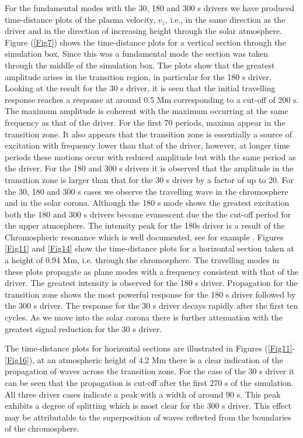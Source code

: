 \documentclass[preprint,authoryear,12pt]{elsarticle}
\begin{document}
For the fundamental modes with the 30, 180 and 300 s drivers we have produced time-distance plots of the plasma velocity, $v_z$, i.e., in the same direction as the driver and in the direction of increasing height through the solar atmosphere.  Figure (\ref{Fig7})
 shows the time-distance plots for a vertical section through the simulation box. Since this was a fundamental mode the section was taken through the middle of the simulation box. The plots show that the greatest amplitude arises in the transition region, in particular for the 180 s driver. Looking at the result for the 30 s driver, it is seen that the initial travelling response reaches a response at around 0.5 Mm corresponding to a cut-off of 200 s. The maximum amplitude is coherent with the maximum occurring at the same frequency as that of the driver. For the first 70 periods, maxima appear in the transition zone. It also appears that the transition zone is essentially a source of excitation with frequency lower than that of the driver, however, at longer time periods these motions occur with reduced amplitude but with the same period as the driver. For the 180 and 300 s drivers it is observed that the amplitude in the transition zone is larger than that for the 30 s driver by a factor of up to 20. For the 30, 180 and 300 s cases we observe the travelling wave in the chromosphere and in the solar corona. Although the 180 s mode shows the greatest excitation both the 180 and 300 s drivers become evanescent due the the cut-off period for the upper atmosphere. The intensity peak for the 180s  driver is a result of the Chromospheric resonance which is well documented, see for example \citet{Fleck1991}.  Figures \ref{Fig11} and \ref{Fig14} show the time-distance plots for a horizontal section taken at a height of 0.94 Mm, i.e. through the chromosphere. The travelling modes in these plots propagate as plane modes with a frequency consistent with that of the driver. The greatest intensity is observed for the 180 s driver. Propagation for the transition zone shows the most powerful response for the 180 s driver followed by the 300 s driver. The response for the 30 s driver decays rapidly after the first ten cycles. As we move into the solar corona there is further attenuation with the greatest signal reduction for the 30 s driver.

The time-distance plots for horizontal sections are illustrated in Figures (\ref{Fig11}-\ref{Fig16}), at an atmospheric height of 4.2 Mm there is a clear indication of the propagation of waves across the transition zone. For the case of the 30 s driver it can be seen that  the propagation is cut-off after the first 270 s of the simulation. All three driver cases indicate a peak with a width of around 90 s. This peak exhibits a degree of splitting which is most clear for the 300 s driver.  This effect may be attributable to the superposition of waves reflected from the boundaries of the chromosphere.
\end{document}
